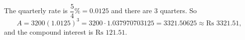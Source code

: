 The quarterly rate is $\dfrac54\%=0.0125$ and there are $3$ quarters. So
\[A=3200(1.0125)^3=3200\cdot1.037970703125=3321.50625\approx\text{Rs }3321.51,\]
and the compound interest is $\boxed{\text{Rs }121.51}$.
